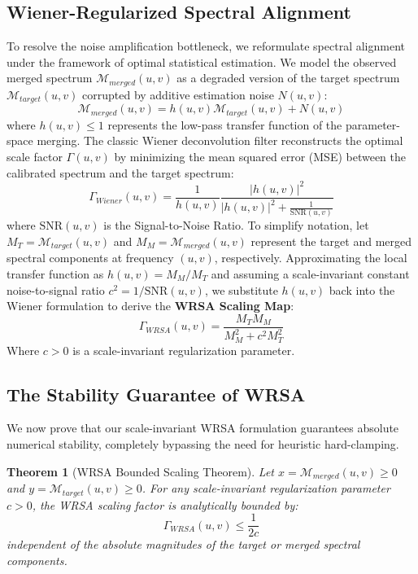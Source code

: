 \documentclass{article}
\theoremstyle{plain}
\newtheorem{theorem}{Theorem}[section]
\theoremstyle{definition}
\theoremstyle{remark}
\begin{document}
\subsection{Wiener-Regularized Spectral Alignment}
To resolve the noise amplification bottleneck, we reformulate spectral alignment under the framework of optimal statistical estimation. We model the observed merged spectrum $\mathcal{M}_{merged}(u, v)$ as a degraded version of the target spectrum $\mathcal{M}_{target}(u, v)$ corrupted by additive estimation noise $N(u, v)$:
\begin{equation}
  \mathcal{M}_{merged}(u, v) = h(u, v) \mathcal{M}_{target}(u, v) + N(u, v)
\end{equation}
where $h(u, v) \le 1$ represents the low-pass transfer function of the parameter-space merging. The classic Wiener deconvolution filter reconstructs the optimal scale factor $\Gamma(u, v)$ by minimizing the mean squared error (MSE) between the calibrated spectrum and the target spectrum:
\begin{equation}
  \Gamma_{Wiener}(u, v) = \frac{1}{h(u, v)} \frac{|h(u, v)|^2}{|h(u, v)|^2 + \frac{1}{\text{SNR}(u, v)}}
\end{equation}
where $\text{SNR}(u, v)$ is the Signal-to-Noise Ratio. To simplify notation, let $M_T = \mathcal{M}_{target}(u, v)$ and $M_M = \mathcal{M}_{merged}(u, v)$ represent the target and merged spectral components at frequency $(u, v)$, respectively. Approximating the local transfer function as $h(u, v) = M_M / M_T$ and assuming a scale-invariant constant noise-to-signal ratio $c^2 = 1/\text{SNR}(u, v)$, we substitute $h(u, v)$ back into the Wiener formulation to derive the \textbf{WRSA Scaling Map}:
\begin{equation}
  \label{eq:wrsa}
  \Gamma_{WRSA}(u, v) = \frac{M_T M_M}{M_M^2 + c^2 M_T^2}
\end{equation}
Where $c > 0$ is a scale-invariant regularization parameter.

\subsection{The Stability Guarantee of WRSA}
We now prove that our scale-invariant WRSA formulation guarantees absolute numerical stability, completely bypassing the need for heuristic hard-clamping.

\begin{theorem}[WRSA Bounded Scaling Theorem]
  Let $x = \mathcal{M}_{merged}(u, v) \ge 0$ and $y = \mathcal{M}_{target}(u, v) \ge 0$. For any scale-invariant regularization parameter $c > 0$, the WRSA scaling factor is analytically bounded by:
  \begin{equation}
    \Gamma_{WRSA}(u, v) \le \frac{1}{2c}
  \end{equation}
  independent of the absolute magnitudes of the target or merged spectral components.
\end{theorem}
\end{document}

